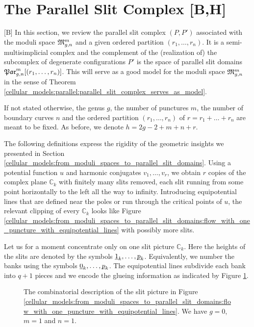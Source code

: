 \section{The Parallel Slit Complex [B,H]}
\label{cellular_models:parallel}

[B] In this section, we review the parallel slit complex $(P,P')$ associated with the moduli space $\mathfrak{M}^m_{g,n}$ and a given ordered partition $(r_1, \ldots, r_n)$.
It is a semi-multisimplicial complex and the complement of the (realization of) the subcomplex of degenerate configurations $P'$ is the space of parallel slit domains $\Parr$.
This will serve as a good model for the moduli space $\mathfrak{M}^m_{g,n}$ in the sense of Theorem \ref{cellular_models:parallel:parallel_slit_complex_serves_as_model}.

If not stated otherwise, the genus $g$, the number of punctures $m$, the number of boundary curves $n$ and
the ordered partition $(r_1, \ldots, r_n)$ of $r = r_1 + \ldots + r_n$ are meant to be fixed.
As before, we denote $h = 2g - 2 + m + n + r$.

The following definitions express the rigidity of the geometric insights we presented in Section \ref{cellular_models:from_moduli_spaces_to_parallel_slit_domains}.
Using a potential function $u$ and harmonic conjugates $v_1, \ldots ,v_r$, 
we obtain $r$ copies of the complex plane $\mathbb C_k$ with finitely many slits removed,
each slit running from some point horizontally to the left all the way to infinity.
Introducing equipotential lines that are defined near the poles or run through the critical points of $u$, 
the relevant clipping of every $\mathbb C_k$ looks like Figure \ref{cellular_models:from_moduli_spaces_to_parallel_slit_domains:flow_with_one_puncture_with_equipotential_lines}
with possibly more slits.

Let us for a moment concentrate only on one slit picture $\mathbb C_k$.
Here the heights of the slits are denoted by the symbols $\ul 1_k, \ldots, \ul p_k$.
Equivalently, we number the banks using the symbols $\ul 0_k, \ldots, \ul p_k$.
The equipotential lines subdivide each bank into $q+1$ pieces and we encode the glueing information as indicated by Figure \ref{cellular_models:parallel:introduce_symbols}.
\begin{figure}[ht]
\centering
{}
\caption{\label{cellular_models:parallel:introduce_symbols}
    The combinatorial description of the slit picture in Figure \ref{cellular_models:from_moduli_spaces_to_parallel_slit_domains:flow_with_one_puncture_with_equipotential_lines}.
    We have $g=0$, $m=1$ and $n=1$.}
\end{figure}

